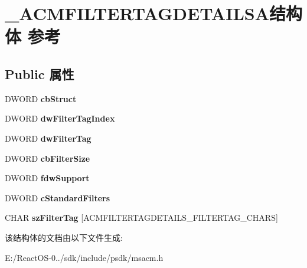 \hypertarget{struct___a_c_m_f_i_l_t_e_r_t_a_g_d_e_t_a_i_l_s_a}{}\section{\+\_\+\+A\+C\+M\+F\+I\+L\+T\+E\+R\+T\+A\+G\+D\+E\+T\+A\+I\+L\+S\+A结构体 参考}
\label{struct___a_c_m_f_i_l_t_e_r_t_a_g_d_e_t_a_i_l_s_a}
\subsection*{Public 属性}
\begin{DoxyCompactItemize}
\item 
\mbox{\label{struct___a_c_m_f_i_l_t_e_r_t_a_g_d_e_t_a_i_l_s_a_a030040bf1f919f81d769f15d1c568685}} 
D\+W\+O\+RD {\bfseries cb\+Struct}
\item 
\mbox{\label{struct___a_c_m_f_i_l_t_e_r_t_a_g_d_e_t_a_i_l_s_a_a341ec86f7120f09b2a4abd3179552361}} 
D\+W\+O\+RD {\bfseries dw\+Filter\+Tag\+Index}
\item 
\mbox{\label{struct___a_c_m_f_i_l_t_e_r_t_a_g_d_e_t_a_i_l_s_a_af078a18b8808fc3d75c6f75a2c59093b}} 
D\+W\+O\+RD {\bfseries dw\+Filter\+Tag}
\item 
\mbox{\label{struct___a_c_m_f_i_l_t_e_r_t_a_g_d_e_t_a_i_l_s_a_a14b13ce6672772600f1ab3ed3d952ee0}} 
D\+W\+O\+RD {\bfseries cb\+Filter\+Size}
\item 
\mbox{\label{struct___a_c_m_f_i_l_t_e_r_t_a_g_d_e_t_a_i_l_s_a_a61a38ad471cf498f6c430fdc45fbd7db}} 
D\+W\+O\+RD {\bfseries fdw\+Support}
\item 
\mbox{\label{struct___a_c_m_f_i_l_t_e_r_t_a_g_d_e_t_a_i_l_s_a_ab5cb37531777fd511854c53c0d6d1101}} 
D\+W\+O\+RD {\bfseries c\+Standard\+Filters}
\item 
\mbox{\label{struct___a_c_m_f_i_l_t_e_r_t_a_g_d_e_t_a_i_l_s_a_af97a72e729027cdae2b2ca680c471666}} 
C\+H\+AR {\bfseries sz\+Filter\+Tag} \mbox{[}A\+C\+M\+F\+I\+L\+T\+E\+R\+T\+A\+G\+D\+E\+T\+A\+I\+L\+S\+\_\+\+F\+I\+L\+T\+E\+R\+T\+A\+G\+\_\+\+C\+H\+A\+RS\mbox{]}
\end{DoxyCompactItemize}


该结构体的文档由以下文件生成\+:\begin{DoxyCompactItemize}
\item 
E\+:/\+React\+O\+S-\/0../sdk/include/psdk/msacm.\+h\end{DoxyCompactItemize}
